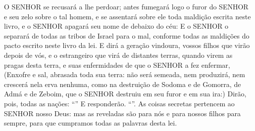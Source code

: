 {{  O SENHOR se recusará a lhe perdoar; antes fumegará logo o furor do SENHOR e seu zelo sobre o tal homem, e se assentará sobre ele toda maldição escrita neste livro, e o SENHOR apagará seu nome de debaixo do céu:
  E o SENHOR o separará de todas as tribos de Israel para o mal, conforme todas as maldições do pacto escrito neste livro da lei.
  E dirá a geração vindoura, vossos filhos que virão depois de vós, e o estrangeiro que virá de distantes terras, quando virem as pragas desta terra, e suas enfermidades de que o SENHOR a fez enfermar,
  (Enxofre e sal, abrasada toda sua terra: não será semeada, nem produzirá, nem crescerá nela erva nenhuma, como na destruição de Sodoma e de Gomorra, de Admá e de Zeboim, que o SENHOR destruiu em seu furor e em sua ira:)
  Dirão, pois, todas as nações: \enquote{}
  E responderão. \enquote{}.
  As coisas secretas pertencem ao SENHOR nosso Deus: mas as reveladas são para nós e para nossos filhos para sempre, para que cumpramos todas as palavras desta lei}.
\par }

